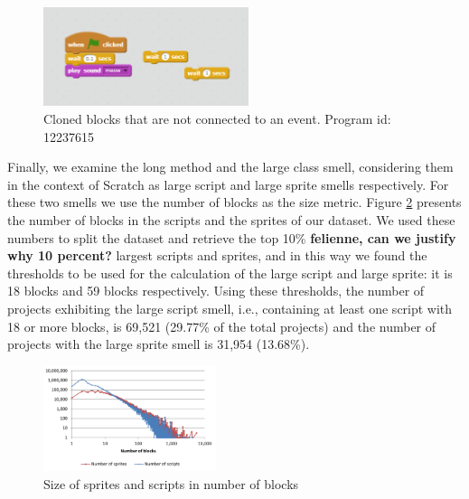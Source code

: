 \documentclass{sig-alternate}
\newcommand{\todo}[1]{\textbf{#1}}
\begin{document}
\begin{figure}
	\begin{center}
		\includegraphics[width=6cm]{fig/Unconnected_clones.png}
		\caption{Cloned blocks that are not connected to an event. Program id: 12237615}
		\label{fig:Unconnected_clones}
	\end{center}
\end{figure} 

Finally, we examine the long method and the large class smell, considering them in the context of Scratch as large script and large sprite smells respectively. For these two smells we use the number of blocks as the size metric. Figure \ref{fig:longmethod} presents the number of blocks in the scripts and the sprites of our dataset. We used these numbers to split the dataset and retrieve the top 10\% \todo{felienne, can we justify why 10 percent?} largest scripts and sprites, and in this way we found the thresholds to be used for the calculation of the large script and large sprite: it is 18 blocks and 59 blocks respectively. Using these thresholds, the number of projects exhibiting the large script smell, i.e., containing at least one script with 18 or more blocks, is 69,521 (29.77\% of the total projects) and the number of projects with the large sprite smell is 31,954 (13.68\%).

\begin{figure}
	\centering
	\includegraphics[width=0.45\textwidth]{fig/charts/13longmethod}
	\caption{Size of sprites and scripts in number of blocks}
	\label{fig:longmethod}
\end{figure}

\noindent
{}
\end{document}
